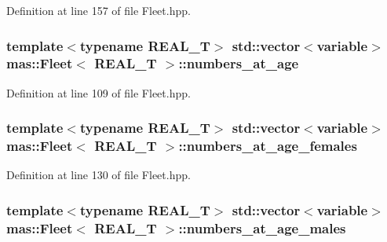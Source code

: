 Definition at line 157 of file Fleet.\-hpp.

\hypertarget{structmas_1_1_fleet_a1f88d8e497852415b1e4010f8ab4d18f}{
\subsubsection[{numbers\-\_\-at\-\_\-age}]{\setlength{\rightskip}{0pt plus 5cm}template$<$typename R\-E\-A\-L\-\_\-\-T$>$ std\-::vector$<${\bf variable}$>$ {\bf mas\-::\-Fleet}$<$ R\-E\-A\-L\-\_\-\-T $>$\-::numbers\-\_\-at\-\_\-age}}\label{structmas_1_1_fleet_a1f88d8e497852415b1e4010f8ab4d18f}


Definition at line 109 of file Fleet.\-hpp.

\hypertarget{structmas_1_1_fleet_afbe9209cae969e13ee6480efab603e02}{
\subsubsection[{numbers\-\_\-at\-\_\-age\-\_\-females}]{\setlength{\rightskip}{0pt plus 5cm}template$<$typename R\-E\-A\-L\-\_\-\-T$>$ std\-::vector$<${\bf variable}$>$ {\bf mas\-::\-Fleet}$<$ R\-E\-A\-L\-\_\-\-T $>$\-::numbers\-\_\-at\-\_\-age\-\_\-females}}\label{structmas_1_1_fleet_afbe9209cae969e13ee6480efab603e02}


Definition at line 130 of file Fleet.\-hpp.

\hypertarget{structmas_1_1_fleet_aa4aa9e9a3d34fc15d15543ae02aea2bd}{
\subsubsection[{numbers\-\_\-at\-\_\-age\-\_\-males}]{\setlength{\rightskip}{0pt plus 5cm}template$<$typename R\-E\-A\-L\-\_\-\-T$>$ std\-::vector$<${\bf variable}$>$ {\bf mas\-::\-Fleet}$<$ R\-E\-A\-L\-\_\-\-T $>$\-::numbers\-\_\-at\-\_\-age\-\_\-males}}\label{structmas_1_1_fleet_aa4aa9e9a3d34fc15d15543ae02aea2bd}


